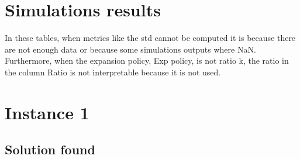\onecolumn %

\section{Simulations results}

In these tables, when metrics like the std cannot be computed it is because there are not enough data or because some simulations outputs where NaN. Furthermore, when the expansion policy, Exp policy, is not ratio k, the ratio in the column Ratio is not interpretable because it is not used.

\section*{Instance 1}
\subsection{Solution found}
